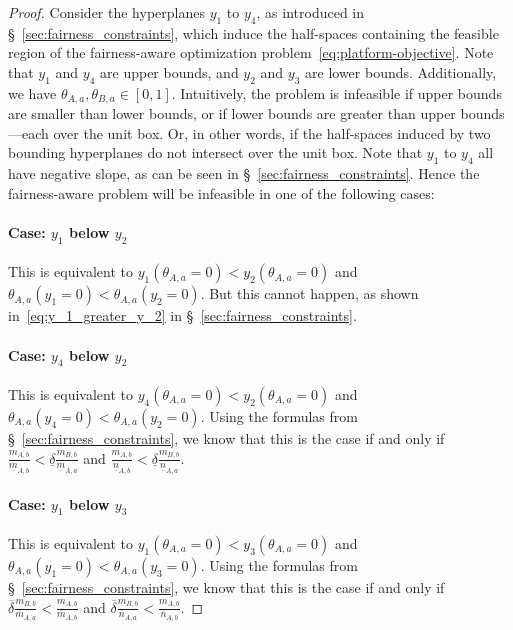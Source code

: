 \documentclass[letterpaper]{article} %
\begin{document}
\begin{proof}

Consider the hyperplanes $y_1$ to $y_4$, as introduced in \S~\ref{sec:fairness_constraints}, which induce the half-spaces containing the feasible region of the fairness-aware optimization problem~\eqref{eq:platform-objective}.
%
Note that $y_1$ and $y_4$ are upper bounds, and $y_2$ and $y_3$ are lower bounds.
%
Additionally, we have $\theta_{A,a},\theta_{B,a} \in [0,1]$.
%
Intuitively, the problem is infeasible if upper bounds are smaller than lower bounds, or if lower bounds are greater than upper bounds---each over the unit box.
%
Or, in other words, if the half-spaces induced by two bounding hyperplanes do not intersect over the unit box.
%
Note that $y_1$ to $y_4$ all have negative slope, as can be seen in \S~\ref{sec:fairness_constraints}.
%
Hence the fairness-aware problem will be infeasible in one of the following cases:

\paragraph{Case: $y_1$ below $y_2$}
This is equivalent to $y_1(\theta_{A,a}=0) < y_2(\theta_{A,a}=0)$ and $\theta_{A,a}(y_1=0) < \theta_{A,a}(y_2=0)$.
%
But this cannot happen, as shown in~\eqref{eq:y_1_greater_y_2} in \S~\ref{sec:fairness_constraints}.

\paragraph{Case: $y_4$ below $y_2$}
This is equivalent to $y_4(\theta_{A,a}=0) < y_2(\theta_{A,a}=0)$ and $\theta_{A,a}(y_4=0) < \theta_{A,a}(y_2=0)$. Using the formulas from \S~\ref{sec:fairness_constraints}, we know that this is the case if and only if $\frac{m_{A,b}}{\underline{m}_{A,b}} < \underline{\delta} \frac{m_{B,b}}{\underline{m}_{A,a}}$ and $\frac{m_{A,b}}{\underline{n}_{A,b}} < \underline{\delta} \frac{m_{B,b}}{\underline{n}_{A,a}}$.

\paragraph{Case: $y_1$ below $y_3$}
This is equivalent to $y_1(\theta_{A,a}=0) < y_3(\theta_{A,a}=0)$ and $\theta_{A,a}(y_1=0) < \theta_{A,a}(y_3=0)$. Using the formulas from \S~\ref{sec:fairness_constraints}, we know that this is the case if and only if $\overline{\delta} \frac{m_{B,b}}{\overline{m}_{A,a}} < \frac{m_{A,b}}{\overline{m}_{A,b}}$ and $\overline{\delta} \frac{m_{B,b}}{\overline{n}_{A,a}} < \frac{m_{A,b}}{\overline{n}_{A,b}}$.


\end{proof}
\end{document}
